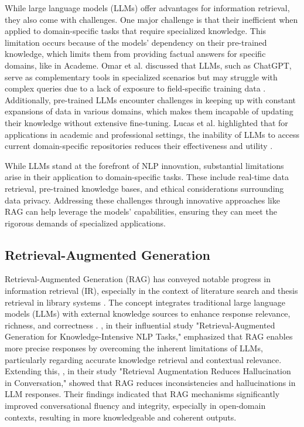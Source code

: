 \begin{refsection}
\newpage
\clearpage
While large language models (LLMs) offer advantages for information retrieval, they also come with challenges. One major challenge is that their inefficient when applied to domain-specific tasks that require specialized knowledge. This limitation occurs because of the models' dependency on their pre-trained knowledge, which limits them from providing factual answers for specific domains, like in Academe. Omar et al. discussed that LLMs, such as ChatGPT, serve as complementary tools in specialized scenarios but may struggle with complex queries due to a lack of exposure to field-specific training data \cite{khraisha2024can}. Additionally, pre-trained LLMs encounter challenges in keeping up with constant expansions of data in various domains, which makes them incapable of updating their knowledge without extensive fine-tuning. Lucas et al. highlighted that for applications in academic and professional settings, the inability of LLMs to access current domain-specific repositories reduces their effectiveness and utility \cite{gartlehner2023data}.


\bigbreak
While LLMs stand at the forefront of NLP innovation, substantial limitations arise in their application to domain-specific tasks. These include real-time data retrieval, pre-trained knowledge bases, and ethical considerations surrounding data privacy. Addressing these challenges through innovative approaches like RAG can help leverage the models' capabilities, ensuring they can meet the rigorous demands of specialized applications.


\subsection{Retrieval-Augmented Generation}

Retrieval-Augmented Generation (RAG) has conveyed notable progress in information retrieval (IR), especially in the context of literature search and thesis retrieval in library systems \cite{thomo2024pubmed}. The concept integrates traditional large language models (LLMs) with external knowledge sources to enhance response relevance, richness, and correctness \cite{chen2024benchmarking}.
\newpage   
\clearpage
\citeauthor{lewis2020retrieval} \citeyear{lewis2020retrieval}, in their influential study "Retrieval-Augmented Generation for Knowledge-Intensive NLP Tasks," emphasized that RAG enables more precise responses by overcoming the inherent limitations of LLMs, particularly regarding accurate knowledge retrieval and contextual relevance. Extending this, \citeauthor{shuster2021retrieval} \citeyear{shuster2021retrieval}, in their study "Retrieval Augmentation Reduces Hallucination in Conversation," showed that RAG reduces inconsistencies and hallucinations in LLM responses. Their findings indicated that RAG mechanisms significantly improved conversational fluency and integrity, especially in open-domain contexts, resulting in more knowledgeable and coherent outputs.


\end{refsection}
